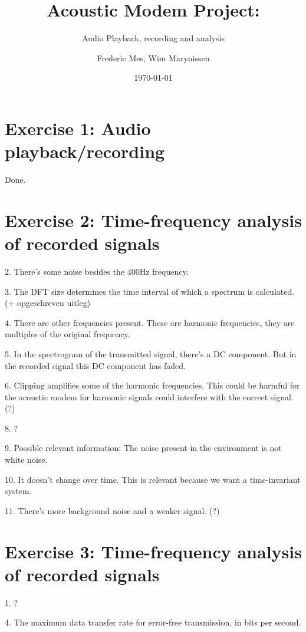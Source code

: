 \documentclass[a4paper,11pt]{article}
\title{ Acoustic Modem Project:}
\subtitle{Audio Playback, recording and analysis}
\author{Frederic Mes, Wim Marynissen}
\date{\today}
\begin{document}
\maketitle

\section{Exercise 1: Audio playback/recording}
Done.


\section{Exercise 2: Time-frequency analysis of recorded signals}

2.	There's some noise besides the 400Hz frequency.

3.	The DFT size determines the time interval of which a spectrum is calculated.
	(+ opgeschreven uitleg)
	
4.	There are other frequencies present. These are harmonic frequencies, they are
multiples of the original frequency.

5.	In the spectrogram of the transmitted signal, there's a DC component. But in
the recorded signal this DC component has faded. 

6.	Clipping amplifies some of the harmonic frequencies. This could be harmful
for the acoustic modem for harmonic signals could interfere with the correct
signal. (?)

8.	?

9. Possible relevant information: The noise present in the environment is not
white noise.

10. It doesn't change over time. This is relevant because we want a
time-invariant system.

11. There's more background noise and a weaker signal. (?)

\section{Exercise 3: Time-frequency analysis of recorded signals}

1. ?

4. The maximum data transfer rate for error-free transmission, in bits per
second.
\end{document}
